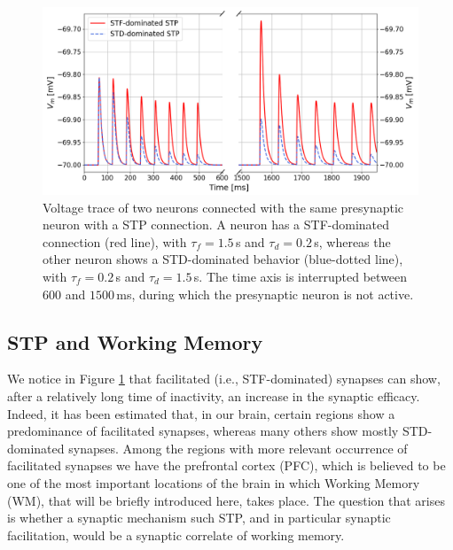 \documentclass[a4paper, 12pt, twoside, openright]{book}
\begin{document}
\begin{figure}[H]
    \centering
    \includegraphics[width=\columnwidth]{figures/STP-sample.png}
    \caption{Voltage trace of two neurons connected with the same presynaptic neuron with a STP connection. A neuron has a STF-dominated connection (red line), with $\tau_f=1.5$\,s and $\tau_d=0.2$\,s, whereas the other neuron shows a STD-dominated behavior (blue-dotted line), with $\tau_f=0.2$\,s and $\tau_d=1.5$\,s. The time axis is interrupted between $600$ and $1500$\,ms, during which the presynaptic neuron is not active.}
    \label{fig:STPsample}
\end{figure}

\subsection{STP and Working Memory}
\label{sec:stp_wm}
We notice in Figure \ref{fig:STPsample} that facilitated (i.e., STF-dominated) synapses can show, after a relatively long time of inactivity, an increase in the synaptic efficacy. Indeed, it has been estimated that, in our brain, certain regions show a predominance of facilitated synapses, whereas many others show mostly STD-dominated synapses. Among the regions with more relevant occurrence of facilitated synapses we have the prefrontal cortex (PFC), which is believed to be one of the most important locations of the brain in which Working Memory (WM), that will be briefly introduced here, takes place. The question that arises is whether a synaptic mechanism such STP, and in particular synaptic facilitation, would be a synaptic correlate of working memory.
\end{document}
